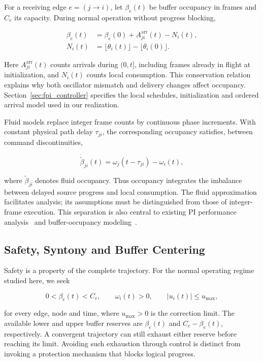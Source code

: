 For a receiving edge $e=(j\to i)$, let $\beta_e(t)$ be buffer occupancy in frames and $C_e$ its capacity. During normal operation without progress blocking,

\begin{align}
\beta_e(t)&=\beta_e(0)+A_{ji}^{\mathrm{arr}}(t)-N_i(t),\nonumber\\
N_i(t)&=\lfloor\theta_i(t)\rfloor-\lfloor\theta_i(0)\rfloor.
\label{eq:bg_count_balance}
\end{align}

Here $A_{ji}^{\mathrm{arr}}(t)$ counts arrivals during $(0,t]$, including frames already in flight at initialization, and $N_i(t)$ counts local consumption. This conservation relation explains why both oscillator mismatch and delivery changes affect occupancy. Section~\ref{sec:fpi_controller} specifies the local schedules, initialization and ordered arrival model used in our realization.

Fluid models replace integer frame counts by continuous phase increments. With constant physical path delay $\tau_{ji}$, the corresponding occupancy satisfies, between command discontinuities,

\begin{equation}
\dot{\widetilde\beta}_{ji}(t)
=\omega_j(t-\tau_{ji})-\omega_i(t),
\end{equation}

where $\widetilde\beta_{ji}$ denotes fluid occupancy. Thus occupancy integrates the imbalance between delayed source progress and local consumption. The fluid approximation facilitates analysis; its assumptions must be distinguished from those of integer-frame execution. This separation is also central to existing PI performance analysis~\cite{lall2022resistance} and buffer-occupancy modeling~\cite{lall2024bufferOccupancy}.

\subsection{Safety, Syntony and Buffer Centering}

Safety is a property of the complete trajectory. For the normal operating regime studied here, we seek

\begin{equation}
0<\beta_e(t)<C_e,\qquad
\omega_i(t)>0,\qquad |u_i(t)|\le u_{\max},
\end{equation}

for every edge, node and time, where $u_{\max}>0$ is the correction limit. The available lower and upper buffer reserves are $\beta_e(t)$ and $C_e-\beta_e(t)$, respectively. A convergent trajectory can still exhaust either reserve before reaching its limit. Avoiding such exhaustion through control is distinct from invoking a protection mechanism that blocks logical progress.

